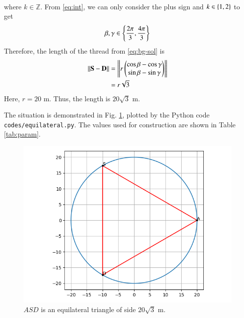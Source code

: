 \documentclass[journal,12pt,twocolumn]{IEEEtran}
\begin{document}
\begin{enumerate}
\begin{align}
    \end{align}
    where $k \in \mathbb{Z}$. From \eqref{eq:int}, we can only consider
    the plus sign and $k \in \left\{1,2\right\}$ to get
    \begin{align}
        \beta,\gamma \in \left\{\frac{2\pi}{3},\frac{4\pi}{3}\right\}
        \label{eq:bg-sol}
    \end{align}
    Therefore, the length of the thread from \eqref{eq:bg-sol} is
    \begin{align}
        \left\lVert\mathbf{S}-\mathbf{D}\right\rVert &= \left\lVert r\begin{pmatrix}\cos\beta-\cos\gamma\\\sin\beta-\sin\gamma\end{pmatrix}\right\rVert \\
                               &= r\sqrt{3}
    \end{align}
    Here, $r = 20$ m. Thus, the length is $20\sqrt{3}$ m.

    The situation is demonstrated in Fig. \ref{fig:equilateral}, plotted by the 
    Python code \texttt{codes/equilateral.py}. The values used for 
    construction are shown in Table \ref{tab:param}.
    \begin{table}[!ht]
        \centering
        
        \caption{Parameters used in the construction of Fig. \ref{fig:equilateral}.}
        \label{tab:param}
    \end{table}
    \begin{figure}[!ht]
        \centering
        \includegraphics[width=\columnwidth]{figs/equilateral.png}
        \caption{$ASD$ is an equilateral triangle of side $20\sqrt{3}$ m.}
        \label{fig:equilateral}
    \end{figure}
\end{enumerate}
\end{document}
